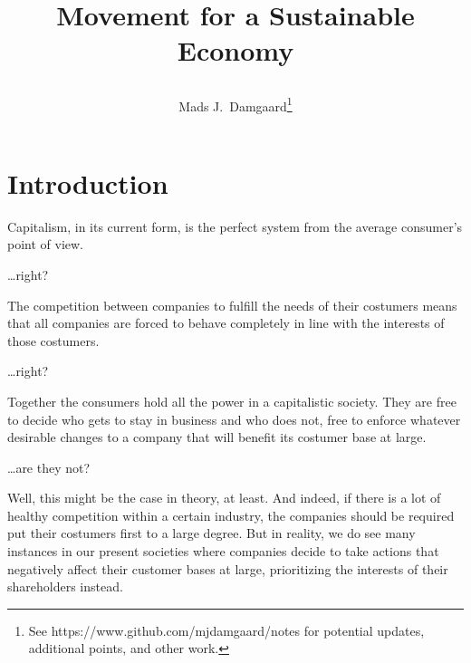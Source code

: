 \documentclass{article}
\title{
	Movement for a Sustainable Economy
	\author{Mads J.\ Damgaard\footnote{
		See https://www.github.com/mjdamgaard/notes for potential updates, additional points, and other work.
	}}
}
\begin{document}
\maketitle



\section{Introduction} \label{MSE_intro}

{\itshape
	
	Capitalism, in its current form, is the perfect system from the average consumer's point of view.
	
	\vspace{0.5em}
	
	\ldots right? 
	
	\vspace{0.5em}
	
	\noindent The competition between companies to fulfill the needs of their costumers means that all companies are forced to behave completely in line with the interests of those costumers.
	
	\vspace{0.5em}
	
	\ldots right?
	
	\vspace{0.5em}
	
	\noindent Together the consumers hold all the power in a capitalistic society. They are free to decide who gets to stay in business and who does not, free to enforce whatever desirable changes to a company that will benefit its costumer base at large.
	
	\vspace{0.5em}
	
	\ldots are they not?
	
}


\vspace{0.8em}

\noindent Well, this might be the case in theory, at least.  And indeed, if there is a lot of healthy competition within a certain industry, the companies should be required put their costumers first to a large degree.
But in reality, we do see many instances in our present societies where companies decide to take actions that negatively affect their customer bases at large, prioritizing the interests of their shareholders instead. 
\end{document}
